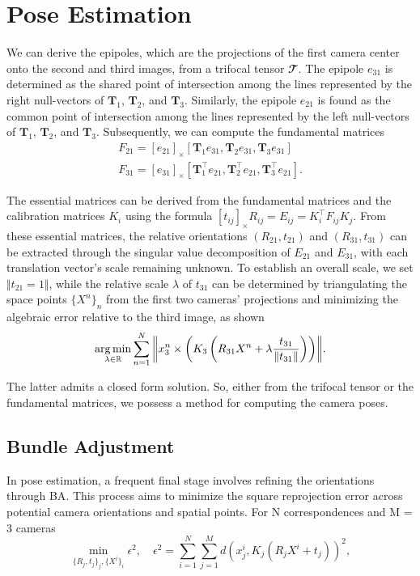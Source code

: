 \section{Pose Estimation}\label{sec:estimation}
We can derive the epipoles, which are the projections of the first camera center onto the second and third images, from a trifocal tensor \( \mathbfcal{T} \). The epipole \( e_{31} \) is determined as the shared point of intersection among the lines represented by the right null-vectors of \( \bm{T}_1 \), \( \bm{T}_2 \), and \( \bm{T}_3 \). Similarly, the epipole \( e_{21} \) is found as the common point of intersection among the lines represented by the left null-vectors of \( \bm{T}_1 \), \( \bm{T}_2 \), and \( \bm{T}_3 \). Subsequently, we can compute the fundamental matrices
\begin{equation}
	\begin{gathered}
		F_{21} = [e_{21}]_{\times}[\bm{T}_1e_{31}, \bm{T}_2e_{31}, \bm{T}_3e_{31}]\\
		F_{31} = [e_{31}]_{\times}[\bm{T}_1^\top e_{21}, \bm{T}_2^\top e_{21}, \bm{T}_3^\top e_{21}].
	\end{gathered}
	\label{eq:fmFromEpiTFT}
\end{equation}

The essential matrices can be derived from the fundamental matrices and the calibration matrices \( K_i \) using the formula \( [t_{ij}]_{\times}R_{ij} = E_{ij} = K_i^\top F_{ij}K_j \). From these essential matrices, the relative orientations \( (R_{21}, t_{21}) \) and \( (R_{31}, t_{31}) \) can be extracted through the singular value decomposition of \( E_{21} \) and \( E_{31} \), with each translation vector's scale remaining unknown. To establish an overall scale, we set \( \Vert t_{21} = 1 \Vert \), while the relative scale \( \lambda \) of \( t_{31} \) can be determined by triangulating the space points \( \{X^n\}_n \) from the first two cameras' projections and minimizing the algebraic error relative to the third image, as shown
\begin{equation}
	\operatorname*{arg\,min}_{\lambda \in \mathbb{R}}{\sum_{n = 1}^{N}{\left\Vert x_3^n \times \left( K_3 \left( R_{31}X^n + \lambda \frac{t_{31}}{\Vert t_{31} \Vert} \right) \right) \right\Vert}}.
\end{equation}

The latter admits a closed form solution. So, either from the trifocal tensor or the fundamental matrices, we possess a method for computing the camera poses.

\subsection{Bundle Adjustment}
In pose estimation, a frequent final stage involves refining the orientations through \ac{BA}. This process aims to minimize the square reprojection error across potential camera orientations and spatial points. For N correspondences and M = 3 cameras
\begin{equation}
	\min_{\{ R_j, t_j \}_j, \{ X^i \}_i}{\epsilon^2}, \quad \epsilon^2 = \sum_{i = 1}^{N}{\sum_{j = 1}^{M}{d \left( x_j^i, K_j(R_jX^i + t_j) \right)^2}},
	\label{eq:baMin}
\end{equation}

